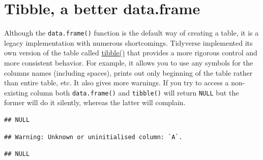 \documentclass[
]{book}
\newenvironment{Shaded}{\begin{snugshade}}{\end{snugshade}}
\newcommand{\AttributeTok}[1]{\textcolor[rgb]{0.77,0.63,0.00}{#1}}
\newcommand{\CommentTok}[1]{\textcolor[rgb]{0.56,0.35,0.01}{\textit{#1}}}
\newcommand{\DecValTok}[1]{\textcolor[rgb]{0.00,0.00,0.81}{#1}}
\newcommand{\FunctionTok}[1]{\textcolor[rgb]{0.00,0.00,0.00}{#1}}
\newcommand{\NormalTok}[1]{#1}
\newcommand{\OtherTok}[1]{\textcolor[rgb]{0.56,0.35,0.01}{#1}}
\newcommand{\SpecialCharTok}[1]{\textcolor[rgb]{0.00,0.00,0.00}{#1}}
\begin{document}
\hypertarget{tibble}{%
\section{Tibble, a better data.frame}\label{tibble}}

Although the \texttt{data.frame()} function is the default way of creating a table, it is a legacy implementation with numerous shortcomings. Tidyverse implemented its own version of the table called \href{https://tibble.tidyverse.org/}{tibble()} that provides a more rigorous control and more consistent behavior. For example, it allows you to use any symbols for the columns names (including spaces), prints out only beginning of the table rather than entire table, etc. It also gives more warnings. If you try to access a non-existing column both \texttt{data.frame()} and \texttt{tibble()} will return \texttt{NULL} but the former will do it silently, whereas the latter will complain.

\begin{Shaded}
\end{Shaded}

\begin{verbatim}
## NULL
\end{verbatim}

\begin{Shaded}
\end{Shaded}

\begin{verbatim}
## Warning: Unknown or uninitialised column: `A`.
\end{verbatim}

\begin{verbatim}
## NULL
\end{verbatim}
\end{document}
